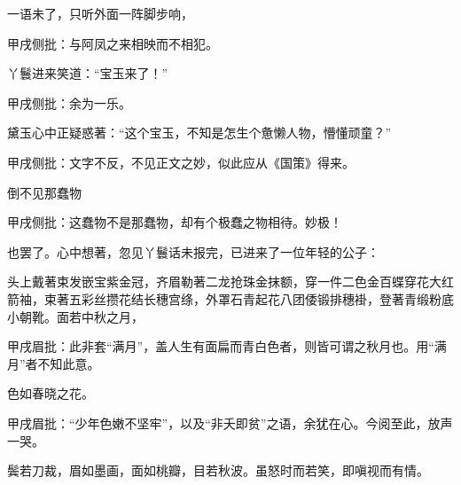 \begin{parag}
    一语未了，只听外面一阵脚步响，\begin{note}甲戌侧批：与阿凤之来相映而不相犯。\end{note}丫鬟进来笑道：“宝玉来了！”\begin{note}甲戌侧批：余为一乐。\end{note}黛玉心中正疑惑著：“这个宝玉，不知是怎生个惫懒人物，懵懂顽童？”\begin{note}甲戌侧批：文字不反，不见正文之妙，似此应从《国策》得来。\end{note}倒不见那蠢物\begin{note}甲戌侧批：这蠢物不是那蠢物，却有个极蠢之物相待。妙极！\end{note}也罢了。心中想著，忽见丫鬟话未报完，已进来了一位年轻的公子：
\end{parag}

\begin{qute2sp}
    头上戴著束发嵌宝紫金冠，齐眉勒著二龙抢珠金抹额，穿一件二色金百蝶穿花大红箭袖，束著五彩丝攒花结长穗宫绦，外罩石青起花八团倭锻排穗褂，登著青缎粉底小朝靴。面若中秋之月，\begin{note}甲戌眉批：此非套“满月”，盖人生有面扁而青白色者，则皆可谓之秋月也。用“满月”者不知此意。\end{note}色如春晓之花。\begin{note}甲戌眉批：“少年色嫩不坚牢”，以及“非夭即贫”之语，余犹在心。今阅至此，放声一哭。\end{note}鬓若刀裁，眉如墨画，面如桃瓣，目若秋波。虽怒时而若笑，即嗔视而有情。
\end{qute2sp}

